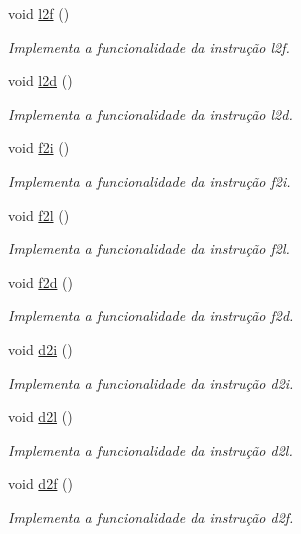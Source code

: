 \begin{DoxyCompactItemize}
void \hyperlink{classOperations_af2064cce9ba6f6a4be257354f21f537e}{l2f} ()
\begin{DoxyCompactList}\small\item\em Implementa a funcionalidade da instrução l2f. \end{DoxyCompactList}\item 
void \hyperlink{classOperations_aab1532a2f22ab943a1ec37e33ae742b3}{l2d} ()
\begin{DoxyCompactList}\small\item\em Implementa a funcionalidade da instrução l2d. \end{DoxyCompactList}\item 
void \hyperlink{classOperations_adea8a32fb2ba183d0200ac22e1126fde}{f2i} ()
\begin{DoxyCompactList}\small\item\em Implementa a funcionalidade da instrução f2i. \end{DoxyCompactList}\item 
void \hyperlink{classOperations_a175cdab8d092bdd6c27bace9efbcd27e}{f2l} ()
\begin{DoxyCompactList}\small\item\em Implementa a funcionalidade da instrução f2l. \end{DoxyCompactList}\item 
void \hyperlink{classOperations_afb29ca09bc75d3342920b1509aba3635}{f2d} ()
\begin{DoxyCompactList}\small\item\em Implementa a funcionalidade da instrução f2d. \end{DoxyCompactList}\item 
void \hyperlink{classOperations_aa8cda1c04343e047078b72b51c575e1c}{d2i} ()
\begin{DoxyCompactList}\small\item\em Implementa a funcionalidade da instrução d2i. \end{DoxyCompactList}\item 
void \hyperlink{classOperations_a2babf3c9e2ac30a70a07f8d43b32440a}{d2l} ()
\begin{DoxyCompactList}\small\item\em Implementa a funcionalidade da instrução d2l. \end{DoxyCompactList}\item 
void \hyperlink{classOperations_ab5a2d770d297ace1ec0e40d3fed9f0e3}{d2f} ()
\begin{DoxyCompactList}\small\item\em Implementa a funcionalidade da instrução d2f. \end{DoxyCompactList}\item 

\end{DoxyCompactItemize}
